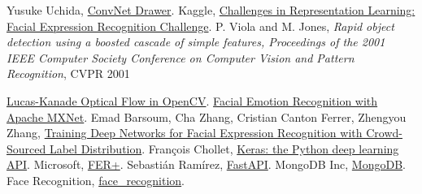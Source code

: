 \documentclass{article}
\begin{document}
\begin{thebibliography}{99}

 Yusuke Uchida, \href{https://github.com/yu4u/convnet-drawer}{ConvNet Drawer}.
 Kaggle, \href{https://www.kaggle.com/c/challenges-in-representation-learning-facial-expression-recognition-challenge/data}{Challenges in Representation Learning: Facial Expression Recognition Challenge}.
 P. Viola and M. Jones, \textit{Rapid object detection using a boosted cascade of simple features, Proceedings of the 2001 IEEE Computer Society Conference on Computer Vision and Pattern Recognition}, CVPR 2001

 \href{https://docs.opencv.org/3.4/d4/dee/tutorial_optical_flow.html}{Lucas-Kanade Optical Flow in OpenCV}.
 \href{https://github.com/TalkAI/facial-emotion-recognition-gluon}{Facial Emotion Recognition with Apache MXNet}.
 Emad Barsoum, Cha Zhang, Cristian Canton Ferrer, Zhengyou Zhang, \href{https://arxiv.org/abs/1608.01041}{Training Deep Networks for Facial Expression Recognition with Crowd-Sourced Label Distribution}.
 François Chollet, \href{https://keras.io/api/}{Keras: the Python deep learning API}.
 Microsoft, \href{https://github.com/microsoft/FERPlus}{FER+}.
 Sebastián Ramírez, \href{https://fastapi.tiangolo.com}{FastAPI}.
 MongoDB Inc, \href{https://www.mongodb.com/}{MongoDB}.
 Face Recognition, \href{https://github.com/ageitgey/face_recognition}{face\_recognition}.


\end{thebibliography}
\end{document}
